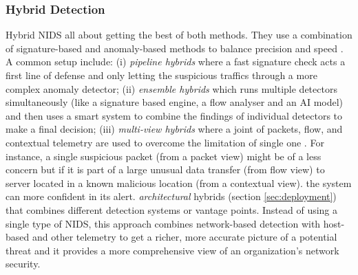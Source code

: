 \subsubsection{Hybrid Detection}
Hybrid NIDS all about getting the best of both methods. They use a combination of signature-based and anomaly-based methods to balance precision and speed \parencite{Maseno2022HybridReview,Naghib2025HybridReview}. A common setup include: (i) \emph{pipeline hybrids} where a fast signature check acts a first line of defense and only letting the suspicious traffics through a more complex anomaly detector; (ii) \emph{ensemble hybrids} which runs multiple detectors simultaneously (like a signature based engine, a flow analyser and an AI model) and then uses a smart system to combine the findings of individual detectors to make a final decision; (iii) \emph{multi-view hybrids}  where a joint of packets, flow, and contextual telemetry are used to overcome the limitation of single one \parencite{Qiu2022DSTHybrid}. For instance, a single suspicious packet (from a packet view) might be of a less concern but if it is part of a large unusual data transfer (from flow view) to server located in a known malicious location (from a contextual view). the system can more confident in its alert.
\emph{architectural} hybrids (section \ref{sec:deployment}) that combines  different detection systems or vantage points. Instead of using a single type of NIDS, this approach combines network-based detection with host-based and other telemetry to get a richer, more accurate picture of a potential threat and it provides a more comprehensive view of an organization's network security. 

